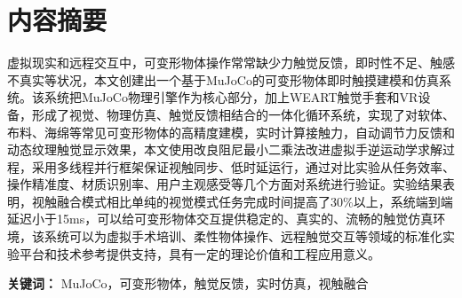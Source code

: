 \section*{内容摘要}
虚拟现实和远程交互中，可变形物体操作常常缺少力触觉反馈，即时性不足、触感不真实等状况，本文创建出一个基于MuJoCo的可变形物体即时触摸建模和仿真系统。该系统把MuJoCo物理引擎作为核心部分，加上WEART触觉手套和VR设备，形成了视觉、物理仿真、触觉反馈相结合的一体化循环系统，实现了对软体、布料、海绵等常见可变形物体的高精度建模，实时计算接触力，自动调节力反馈和动态纹理触觉显示效果，本文使用改良阻尼最小二乘法改进虚拟手逆运动学求解过程，采用多线程并行框架保证视触同步、低时延运行，通过对比实验从任务效率、操作精准度、材质识别率、用户主观感受等几个方面对系统进行验证。实验结果表明，视触融合模式相比单纯的视觉模式任务完成时间提高了30\%以上，系统端到端延迟小于15ms，可以给可变形物体交互提供稳定的、真实的、流畅的触觉仿真环境，该系统可以为虚拟手术培训、柔性物体操作、远程触觉交互等领域的标准化实验平台和技术参考提供支持，具有一定的理论价值和工程应用意义。

\vspace{0.5cm}
\noindent\textbf{关键词：} MuJoCo，可变形物体，触觉反馈，实时仿真，视触融合
